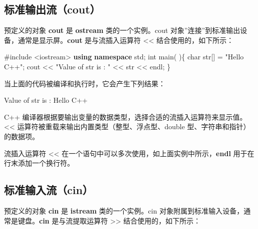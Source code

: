 \documentclass[
]{article}
\newenvironment{Shaded}{}{}
\newcommand{\DataTypeTok}[1]{\textcolor[rgb]{0.56,0.13,0.00}{#1}}
\newcommand{\ImportTok}[1]{#1}
\newcommand{\KeywordTok}[1]{\textcolor[rgb]{0.00,0.44,0.13}{\textbf{#1}}}
\newcommand{\NormalTok}[1]{#1}
\newcommand{\OperatorTok}[1]{\textcolor[rgb]{0.40,0.40,0.40}{#1}}
\newcommand{\PreprocessorTok}[1]{\textcolor[rgb]{0.74,0.48,0.00}{#1}}
\newcommand{\StringTok}[1]{\textcolor[rgb]{0.25,0.44,0.63}{#1}}
\begin{document}
\hypertarget{ux6807ux51c6ux8f93ux51faux6d41cout}{%
\subsection{标准输出流（cout）}\label{ux6807ux51c6ux8f93ux51faux6d41cout}}

预定义的对象 \textbf{cout} 是 \textbf{ostream} 类的一个实例。cout
对象''连接''到标准输出设备，通常是显示屏。\textbf{cout} 是与流插入运算符
\textless\textless{} 结合使用的，如下所示：

\begin{Shaded}
\begin{Highlighting}[]
\PreprocessorTok{\#include }\ImportTok{\textless{}iostream\textgreater{}}\PreprocessorTok{ }
\KeywordTok{using} \KeywordTok{namespace}\NormalTok{ std}\OperatorTok{;} 
\DataTypeTok{int}\NormalTok{ main}\OperatorTok{(} \OperatorTok{)\{}   
   \DataTypeTok{char}\NormalTok{ str}\OperatorTok{[]} \OperatorTok{=} \StringTok{"Hello C++"}\OperatorTok{;}    
\NormalTok{   cout }\OperatorTok{\textless{}\textless{}} \StringTok{"Value of str is : "} \OperatorTok{\textless{}\textless{}}\NormalTok{ str }\OperatorTok{\textless{}\textless{}}\NormalTok{ endl}\OperatorTok{;}
\OperatorTok{\}}
\end{Highlighting}
\end{Shaded}

当上面的代码被编译和执行时，它会产生下列结果：

\begin{Shaded}
\begin{Highlighting}[]
\NormalTok{Value of str is }\OperatorTok{:}\NormalTok{ Hello C}\OperatorTok{++}
\end{Highlighting}
\end{Shaded}

C++
编译器根据要输出变量的数据类型，选择合适的流插入运算符来显示值。\textless\textless{}
运算符被重载来输出内置类型（整型、浮点型、double
型、字符串和指针）的数据项。

流插入运算符 \textless\textless{}
在一个语句中可以多次使用，如上面实例中所示，\textbf{endl}
用于在行末添加一个换行符。

\hypertarget{ux6807ux51c6ux8f93ux5165ux6d41cin}{%
\subsection{标准输入流（cin）}\label{ux6807ux51c6ux8f93ux5165ux6d41cin}}

预定义的对象 \textbf{cin} 是 \textbf{istream} 类的一个实例。cin
对象附属到标准输入设备，通常是键盘。\textbf{cin} 是与流提取运算符
\textgreater\textgreater{} 结合使用的，如下所示：
\end{document}
